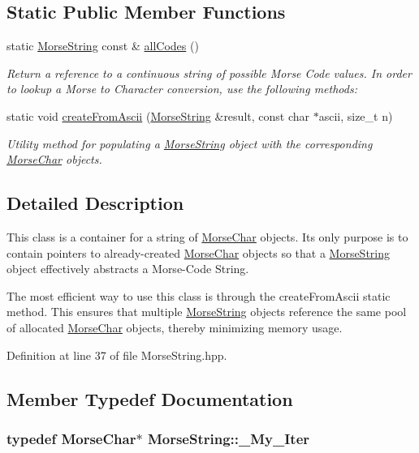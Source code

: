 \subsection*{Static Public Member Functions}
\begin{DoxyCompactItemize}
\item 
static \hyperlink{class_morse_string}{Morse\-String} const \& \hyperlink{class_morse_string_ab11e5de676e09c65fb50289626d5410c}{all\-Codes} ()
\begin{DoxyCompactList}\small\item\em Return a reference to a continuous string of possible Morse Code values. In order to lookup a Morse to Character conversion, use the following methods\-: \end{DoxyCompactList}\item 
static void \hyperlink{class_morse_string_a2324c605f87c9858ab6985d33715a725}{create\-From\-Ascii} (\hyperlink{class_morse_string}{Morse\-String} \&result, const char $\ast$ascii, size\-\_\-t n)
\begin{DoxyCompactList}\small\item\em Utility method for populating a \hyperlink{class_morse_string}{Morse\-String} object with the corresponding \hyperlink{class_morse_char}{Morse\-Char} objects. \end{DoxyCompactList}\end{DoxyCompactItemize}


\subsection{Detailed Description}
This class is a container for a string of \hyperlink{class_morse_char}{Morse\-Char} objects. Its only purpose is to contain pointers to already-\/created \hyperlink{class_morse_char}{Morse\-Char} objects so that a \hyperlink{class_morse_string}{Morse\-String} object effectively abstracts a Morse-\/\-Code String.

The most efficient way to use this class is through the create\-From\-Ascii static method. This ensures that multiple \hyperlink{class_morse_string}{Morse\-String} objects reference the same pool of allocated \hyperlink{class_morse_char}{Morse\-Char} objects, thereby minimizing memory usage. 

Definition at line 37 of file Morse\-String.\-hpp.



\subsection{Member Typedef Documentation}
\hypertarget{class_morse_string_a9fd4ff95c331104a9e2954921201b8af}{
\subsubsection[{\-\_\-\-My\-\_\-\-Iter}]{\setlength{\rightskip}{0pt plus 5cm}typedef {\bf Morse\-Char}$\ast$ {\bf Morse\-String\-::\-\_\-\-My\-\_\-\-Iter}}}\label{class_morse_string_a9fd4ff95c331104a9e2954921201b8af}


